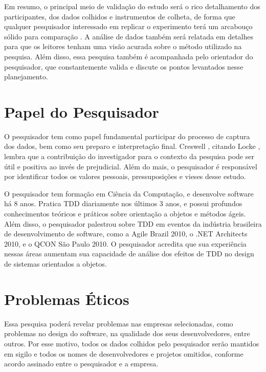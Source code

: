 Em resumo, o principal meio de validação do estudo será o rico detalhamento dos
participantes, dos dados colhidos e instrumentos de colheta, de forma
que qualquer pesquisador interessado em replicar o experimento terá um
arcabouço sólido para comparação \cite{merriam-1998}. A análise de
dados também será relatada em detalhes para que os leitores tenham uma visão
acurada sobre o método utilizado na pesquisa. 
Além disso, essa pesquisa também é acompanhada pelo orientador do pesquisador,
que constantemente valida e discute os pontos levantados nesse planejamento.

\section{Papel do Pesquisador}
\label{sec:planejamento-papel}

O pesquisador tem como papel fundamental participar do processo de captura dos
dados, bem como seu preparo e interpretação final.
Creswell \cite{creswell}, citando Locke \cite{locke}, lembra
que a contribuição do investigador para o contexto da pesquisa pode ser útil e
positiva ao invés de prejudicial. Além do mais, o pesquisador é responsável por
identificar todos os valores pessoais, pressuposições e vieses desse estudo.

O pesquisador tem formação em Ciência da Computação, e desenvolve software há 8
anos. Pratica TDD diariamente nos últimos 3 anos, e possui profundos
conhecimentos teóricos e práticos sobre orientação a objetos e métodos ágeis.
Além disso, o pesquisador palestrou sobre TDD em eventos da indústria brasileira
de desenvolvimento de software, como a Agile Brazil 2010, o .NET Architects
2010, e o QCON São Paulo 2010. O pesquisador acredita que sua experiência nessas
áreas aumentam sua capacidade de análise dos efeitos de TDD no design de sistemas 
orientados a objetos.

\section{Problemas Éticos}
\label{sec:planejamento-etica}

Essa pesquisa poderá revelar problemas nas empresas selecionadas, como problemas
no design do software, na qualidade dos seus desenvolvedores, entre outros. 
Por esse motivo, todos os dados colhidos pelo pesquisador serão mantidos em
sigilo e todos os nomes de desenvolvedores e projetos omitidos, conforme acordo 
assinado entre o pesquisador e a empresa.


